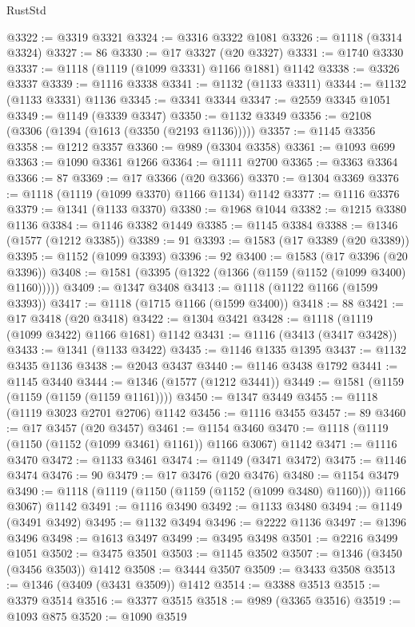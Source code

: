 \begin{lexlean}{RustStd}
\begin{coremodule}
@3322 := @3319 @3321
@3324 := @3316 @3322 @1081
@3326 := @1118 (@3314 @3324)
@3327 := 86
@3330 := @17 @3327 (@20 @3327)
@3331 := @1740 @3330
@3337 := @1118 (@1119 (@1099 @3331) @1166 @1881) @1142
@3338 := @3326 @3337
@3339 := @1116 @3338
@3341 := @1132 (@1133 @3311)
@3344 := @1132 (@1133 @3331) @1136
@3345 := @3341 @3344
@3347 := @2559 @3345 @1051
@3349 := @1149 (@3339 @3347)
@3350 := @1132 @3349
@3356 := @2108 (@3306 (@1394 (@1613 (@3350 (@2193 @1136)))))
@3357 := @1145 @3356
@3358 := @1212 @3357
@3360 := @989 (@3304 @3358)
@3361 := @1093 @699
@3363 := @1090 @3361 @1266
@3364 := @1111 @2700
@3365 := @3363 @3364
@3366 := 87
@3369 := @17 @3366 (@20 @3366)
@3370 := @1304 @3369
@3376 := @1118 (@1119 (@1099 @3370) @1166 @1134) @1142
@3377 := @1116 @3376
@3379 := @1341 (@1133 @3370)
@3380 := @1968 @1044
@3382 := @1215 @3380 @1136
@3384 := @1146 @3382 @1449
@3385 := @1145 @3384
@3388 := @1346 (@1577 (@1212 @3385))
@3389 := 91
@3393 := @1583 (@17 @3389 (@20 @3389))
@3395 := @1152 (@1099 @3393)
@3396 := 92
@3400 := @1583 (@17 @3396 (@20 @3396))
@3408 := @1581 (@3395 (@1322 (@1366 (@1159 (@1152 (@1099 @3400) @1160)))))
@3409 := @1347 @3408
@3413 := @1118 (@1122 @1166 (@1599 @3393))
@3417 := @1118 (@1715 @1166 (@1599 @3400))
@3418 := 88
@3421 := @17 @3418 (@20 @3418)
@3422 := @1304 @3421
@3428 := @1118 (@1119 (@1099 @3422) @1166 @1681) @1142
@3431 := @1116 (@3413 (@3417 @3428))
@3433 := @1341 (@1133 @3422)
@3435 := @1146 @1335 @1395
@3437 := @1132 @3435 @1136
@3438 := @2043 @3437
@3440 := @1146 @3438 @1792
@3441 := @1145 @3440
@3444 := @1346 (@1577 (@1212 @3441))
@3449 := @1581 (@1159 (@1159 (@1159 (@1159 @1161))))
@3450 := @1347 @3449
@3455 := @1118 (@1119 @3023 @2701 @2706) @1142
@3456 := @1116 @3455
@3457 := 89
@3460 := @17 @3457 (@20 @3457)
@3461 := @1154 @3460
@3470 := @1118 (@1119 (@1150 (@1152 (@1099 @3461) @1161)) @1166 @3067) @1142
@3471 := @1116 @3470
@3472 := @1133 @3461
@3474 := @1149 (@3471 @3472)
@3475 := @1146 @3474
@3476 := 90
@3479 := @17 @3476 (@20 @3476)
@3480 := @1154 @3479
@3490 := @1118 (@1119 (@1150 (@1159 (@1152 (@1099 @3480) @1160))) @1166 @3067) @1142
@3491 := @1116 @3490
@3492 := @1133 @3480
@3494 := @1149 (@3491 @3492)
@3495 := @1132 @3494
@3496 := @2222 @1136
@3497 := @1396 @3496
@3498 := @1613 @3497
@3499 := @3495 @3498
@3501 := @2216 @3499 @1051
@3502 := @3475 @3501
@3503 := @1145 @3502
@3507 := @1346 (@3450 (@3456 @3503)) @1412
@3508 := @3444 @3507
@3509 := @3433 @3508
@3513 := @1346 (@3409 (@3431 @3509)) @1412
@3514 := @3388 @3513
@3515 := @3379 @3514
@3516 := @3377 @3515
@3518 := @989 (@3365 @3516)
@3519 := @1093 @875
@3520 := @1090 @3519

\end{coremodule}
\end{lexlean}
